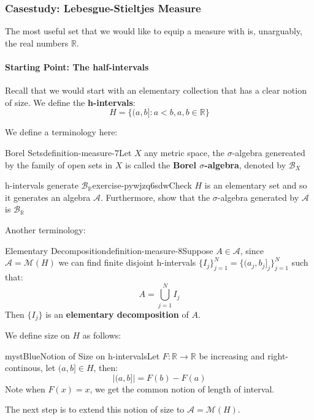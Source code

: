 \subsubsection{Casestudy: Lebesgue-Stieltjes Measure}

The most useful set that we would like to equip a measure with is, unarguably, the real numbers $\mathbb{R}$.

\paragraph{Starting Point: The half-intervals}

Recall that we would start with an elementary collection that has a clear notion of size. We define the \textbf{h-intervals}:
\begin{equation}
H=\{(a,b]:a<b, a,b\in \mathbb{R}\}
\end{equation}

We define a terminology here:

\begin{mystthmdefinition}{Borel Sets}{definition-measure-7}Let $X$ any metric space, the $\sigma$-algebra genereated by the family of open sets in $X$ is called the \textbf{Borel $\sigma$-algebra}, denoted by $\mathcal B_{X}$

\end{mystthmdefinition}
\begin{mystexercise}{h-intervals generate $\mathcal B_{\mathbb{R}}$}{exercise-pywjzq6sdw}\label{exercise-PYWJZq6sDW}\label{exercise-pywjzq6sdw}Check $H$ is an elementary set and so it generates an algebra $\mathcal A$. Furthermore, show that the $\sigma$-algebra generated by $\mathcal A$ is   $\mathcal B_{\mathbb{R}}$

\end{mystexercise}
Another terminology:

\begin{mystthmdefinition}{Elementary Decomposition}{definition-measure-8}Suppose $A\in \mathcal A$, since $\mathcal A=\mathcal M(H)$ we can find finite disjoint h-intervals $\{I_j\}_{j=1}^N=\{(a_j,b_j]_j\}_{j=1}^N$ such that:
\begin{equation}
A=\bigcup_{j=1}^N I_j
\end{equation}
Then $\{I_j\}$ is an \textbf{elementary decomposition} of $A$.

\end{mystthmdefinition}
We define size on $H$ as follows:

\begin{mystadmonition}{mystBlue}{Notion of Size on h-intervals}Let $F:\mathbb{R}\to\mathbb{R}$ be increasing and right-continous, let $(a,b]\in H$, then:
\begin{equation}
|(a,b]|=F(b)-F(a)
\end{equation}
Note when $F(x)=x$, we get the common notion of length of interval.

\end{mystadmonition}
The next step is to extend this notion of size to $\mathcal A=\mathcal M(H)$.

